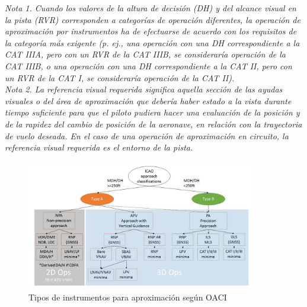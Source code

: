 \begin{tcolorbox}
{\begin{description}
\begin{enumerate}[a)]
\end{enumerate}

\emph{Nota 1. Cuando los valores de la altura de decisión (DH) y del alcance visual en la pista (RVR) corresponden a
categorías de operación diferentes, la operación de aproximación por instrumentos ha de efectuarse de acuerdo con los
requisitos de la categoría más exigente (p. ej., una operación con una DH correspondiente a la CAT IIIA, pero con un RVR de
la CAT IIIB, se consideraría operación de la CAT IIIB, o una operación con una DH correspondiente a la CAT II, pero con un
RVR de la CAT I, se consideraría operación de la CAT II).\\
Nota 2. La referencia visual requerida significa aquella sección de las ayudas visuales o del área de aproximación que
debería haber estado a la vista durante tiempo suficiente para que el piloto pudiera hacer una evaluación de la posición y de la rapidez del cambio de posición de la aeronave, en relación con la trayectoria de vuelo deseada. En el caso de una operación de aproximación en circuito, la referencia visual requerida es el entorno de la pista.
}

\end{description}
}
\end{tcolorbox}



\begin{figure}[!htb]
  \centering
  \includegraphics[width=0.9\textwidth]{06.radionavegacion/Imagenes/OACI-Doc8168-tiposInstrumentosAproximacion.jpg} 
  \caption{Tipos de instrumentos para aproximación según OACI \protect\cite{NuevasAproximaciones}}
  \label{fig:06.tipos.instrumentos.aproximacion}
\end{figure}


